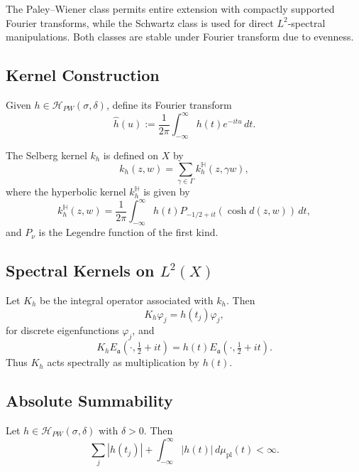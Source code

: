 \begin{remark}
The Paley–Wiener class permits entire extension with compactly supported Fourier transforms, while the Schwartz class is used for direct $L^2$-spectral manipulations. Both classes are stable under Fourier transform due to evenness.
\end{remark}

\subsection{Kernel Construction}

Given $h \in \mathcal{H}_{PW}(\sigma,\delta)$, define its Fourier transform
\[
\widehat{h}(u) := \frac{1}{2\pi} \int_{-\infty}^{\infty} h(t) e^{-itu} \, dt.
\]

\begin{definition}
\label{def:selberg-kernel}
The Selberg kernel $k_h$ is defined on $X$ by
\[
k_h(z,w) = \sum_{\gamma \in \Gamma} k_h^{\mathbb{H}}(z,\gamma w),
\]
where the hyperbolic kernel $k_h^{\mathbb{H}}$ is given by
\[
k_h^{\mathbb{H}}(z,w) = \frac{1}{2\pi} \int_{-\infty}^{\infty} h(t) P_{-1/2+it}(\cosh d(z,w)) \, dt,
\]
and $P_\nu$ is the Legendre function of the first kind.
\end{definition}

\subsection{Spectral Kernels on $L^2(X)$}

\begin{proposition}
\label{prop:spectral-action}
Let $K_h$ be the integral operator associated with $k_h$. Then
\[
K_h \varphi_j = h(t_j)\varphi_j,
\]
for discrete eigenfunctions $\varphi_j$, and
\[
K_h E_{\mathfrak{a}}(\cdot, \tfrac{1}{2}+it) = h(t) E_{\mathfrak{a}}(\cdot, \tfrac{1}{2}+it).
\]
Thus $K_h$ acts spectrally as multiplication by $h(t)$.
\end{proposition}

\subsection{Absolute Summability}

\begin{theorem}
\label{thm:absolute-summability}
Let $h \in \mathcal{H}_{PW}(\sigma,\delta)$ with $\delta > 0$. Then
\[
\sum_j |h(t_j)| + \int_{-\infty}^{\infty} |h(t)| \, d\mu_{\mathrm{pl}}(t) < \infty.
\]
\end{theorem}

